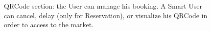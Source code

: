 \begin{figure}[H]


\caption{
        QRCode section: the User can manage his booking. A Smart User can cancel, delay (only for Reservation), or visualize his QRCode in order to access to the market.
     }
     \begin{center}
%
\end{center}
\end{figure}
